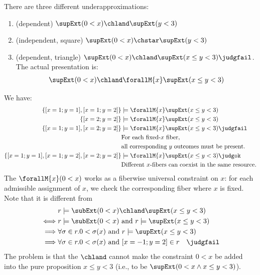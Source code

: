\begin{example} There are three different underapproximations:
  \begin{enumerate}
    \item (dependent) $\supExt (0 < x) \chland \supExt (y < 3)$
    \item (independent, square) $\supExt (0 < x) \chstar \supExt (y < 3)$
    \item (dependent, triangle) $\supExt (0 < x) \chland \supExt (x \leq y < 3)\judgfail$. The actual presentation is:
    \begin{align*}
      \supExt (0 < x) \chland \forallM{x}\supExt (x \leq y < 3)
    \end{align*}
  \end{enumerate}
We have:
\begin{align*}
  \{[x=1; y=1], [x=1; y=2]\} &\models \forallM{x}\supExt (x \leq y < 3)
  \\\{[x=2; y=2]\} &\models \forallM{x}\supExt (x \leq y < 3)
  \\\{[x=1; y=1], [x=2; y=2]\} &\models \forallM{x}\supExt (x \leq y < 3) \judgfail
  \\&\text{For each fixed-$x$ fiber,}
  \\&\text{all corresponding $y$ outcomes must be present.}
  \\\{[x=1; y=1], [x=1; y=2], [x=2; y=2]\} &\models \forallM{x}\supExt (x \leq y < 3) \judgok
  \\&\text{Different $x$-fibers can coexist in the same resource.}
\end{align*}
The $\forallM{x}(0 < x)$ works as a fiberwise universal constraint on $x$: for each
admissible assignment of $x$, we check the corresponding fiber where $x$ is fixed.
Note that it is different from
\begin{align*}
  &r \models \subExt (0 < x) \chland \supExt (x \leq y < 3) 
  \\\iff& r \models \subExt (0 < x) \text{ and } r \models \supExt (x \leq y < 3)
  \\\implies& \forall \sigma \in r. 0 < \sigma(x) \text{ and } r \models \supExt (x \leq y < 3)
  \\\implies& \forall \sigma \in r. 0 < \sigma(x) \text{ and } [x=-1;y=2] \in r \quad \judgfail
\end{align*}\noindent
The problem is that the $\chland$ cannot make the constraint $0 < x$ be added into the pure proposition $x \leq y < 3$ (i.e., to be $\supExt (0 < x \land x \leq y < 3)$).
\end{example}

